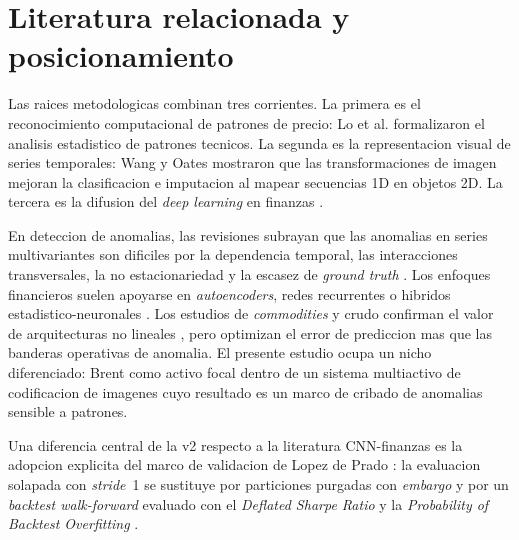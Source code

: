 \documentclass[preprint,12pt,3p]{elsarticle}
\begin{document}
\section{Literatura relacionada y posicionamiento}
Las raices metodologicas combinan tres corrientes. La primera es el
reconocimiento computacional de patrones de precio: Lo et al.
\cite{lo2000foundations} formalizaron el analisis estadistico de patrones
tecnicos. La segunda es la representacion visual de series temporales: Wang y
Oates \cite{wang2015imaging} mostraron que las transformaciones de imagen mejoran
la clasificacion e imputacion al mapear secuencias 1D en objetos 2D. La tercera
es la difusion del \emph{deep learning} en finanzas
\cite{sezer2020financial,hoseinzade2019cnnpred,tsantekidis2020using}.

En deteccion de anomalias, las revisiones subrayan que las anomalias en series
multivariantes son dificiles por la dependencia temporal, las interacciones
transversales, la no estacionariedad y la escasez de \emph{ground truth}
\cite{choi2021deep,li2023deep}. Los enfoques financieros suelen apoyarse en
\emph{autoencoders}, redes recurrentes o hibridos estadistico-neuronales
\cite{crepey2022anomaly,perez2024hybrid}. Los estudios de \emph{commodities} y
crudo confirman el valor de arquitecturas no lineales
\cite{shen2024intelligent,aldabagh2023hybrid,jin2024price,foroutan2024deep}, pero
optimizan el error de prediccion mas que las banderas operativas de anomalia. El
presente estudio ocupa un nicho diferenciado: Brent como activo focal dentro de un
sistema multiactivo de codificacion de imagenes cuyo resultado es un marco de
cribado de anomalias sensible a patrones.

Una diferencia central de la v2 respecto a la literatura CNN-finanzas es la
adopcion explicita del marco de validacion de Lopez de Prado
\cite{lopezdeprado2018advances}: la evaluacion solapada con \emph{stride}~1 se
sustituye por particiones purgadas con \emph{embargo} y por un \emph{backtest
walk-forward} evaluado con el \emph{Deflated Sharpe Ratio}
\cite{bailey2014deflated} y la \emph{Probability of Backtest Overfitting}
\cite{bailey2017probability}.
\end{document}
